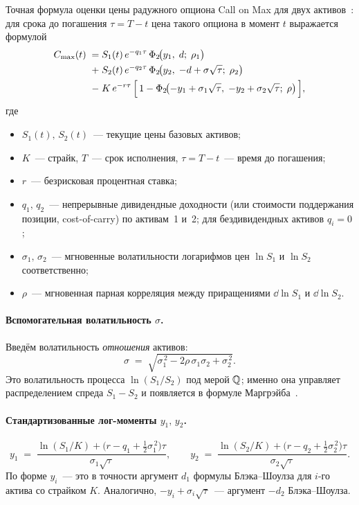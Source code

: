 Точная формула оценки цены радужного опциона Call on Max для двух
активов~\cite{stulz1982options, johnson1987options}: для срока до
погашения $\tau = T-t$ цена такого опциона в момент $t$ выражается
формулой
\begin{equation}
\label{eq:rainbow-stulz}
\begin{aligned}
  C_{\max}(t)
  \;=\;& S_1(t)\,e^{-q_1\tau}\,\Phi_2\!\bigl(y_1,\;d;\;\rho_1\bigr) \\
   +\;& S_2(t)\,e^{-q_2\tau}\,\Phi_2\!\bigl(y_2,\;-d+\sigma\sqrt{\tau};\;\rho_2\bigr) \\
   -\;& K\,e^{-r\tau}\,
        \Bigl[\,1 - \Phi_2\!\bigl(-y_1+\sigma_1\sqrt{\tau},\;
                              -y_2+\sigma_2\sqrt{\tau};\;\rho\bigr)\,\Bigr],
\end{aligned}
\end{equation}
где
\begin{itemize}
  \item $S_1(t),\,S_2(t)$~--- текущие цены базовых активов;
  \item $K$~--- страйк, $T$~--- срок исполнения, $\tau = T-t$~--- время
        до погашения;
  \item $r$~--- безрисковая процентная ставка;
  \item $q_1,\,q_2$~--- непрерывные дивидендные доходности (или
        стоимости поддержания позиции, cost-of-carry) по активам~1
        и~2; для бездивидендных активов $q_i = 0$;
  \item $\sigma_1,\,\sigma_2$~--- мгновенные волатильности логарифмов
        цен $\ln S_1$ и $\ln S_2$ соответственно;
  \item $\rho$~--- мгновенная парная корреляция между приращениями
        $\dd \ln S_1$ и $\dd \ln S_2$.
\end{itemize}

\paragraph{Вспомогательная волатильность $\sigma$.}
Введём волатильность \emph{отношения} активов:
\begin{equation}
\label{eq:rainbow-sigma}
  \sigma \;=\; \sqrt{\sigma_1^{\,2} - 2\rho\,\sigma_1\sigma_2 + \sigma_2^{\,2}}.
\end{equation}
Это волатильность процесса $\ln(S_1/S_2)$ под мерой $\mathbb{Q}$; именно она
управляет распределением спреда $S_1-S_2$ и появляется в формуле
Маргрэйба~\cite{margrabe1978value}.

\paragraph{Стандартизованные лог-моменты $y_1,\,y_2$.}
\begin{equation}
\label{eq:rainbow-y}
  y_1
  \;=\;\frac{\ln(S_1/K) + \bigl(r - q_1 + \tfrac{1}{2}\sigma_1^{\,2}\bigr)\tau}
            {\sigma_1\sqrt{\tau}},
  \qquad
  y_2
  \;=\;\frac{\ln(S_2/K) + \bigl(r - q_2 + \tfrac{1}{2}\sigma_2^{\,2}\bigr)\tau}
            {\sigma_2\sqrt{\tau}}.
\end{equation}
По форме $y_i$~--- это в точности аргумент $d_1$ формулы Блэка--Шоулза
для $i$-го актива со страйком $K$. Аналогично, $-y_i+\sigma_i\sqrt{\tau}$~---
аргумент $-d_2$ Блэка--Шоулза.

